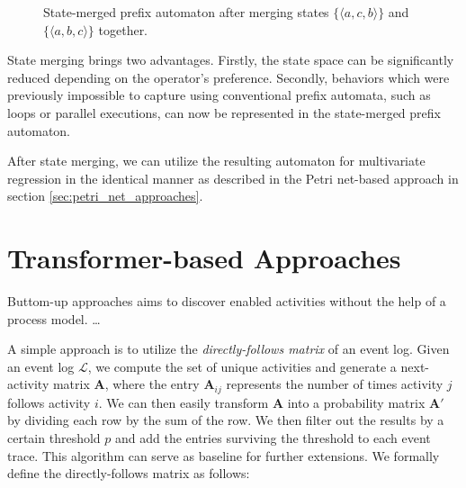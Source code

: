 \begin{figure}[h!]
    \centering
    \caption{State-merged prefix automaton after merging states $\{ \langle a, c, b \rangle \}$ and $\{ \langle a, b, c \rangle \}$ together.}
    \label{fig:state_merged_prefix_automaton_1}
\end{figure}

State merging brings two advantages. Firstly, the state space can be significantly reduced depending on the operator's preference. Secondly, behaviors which were previously impossible to capture using conventional prefix automata, such as loops or parallel executions, can now be represented in the state-merged prefix automaton.

After state merging, we can utilize the resulting automaton for multivariate regression in the identical manner as described in the Petri net-based approach in section \ref{sec:petri_net_approaches}.

\section{Transformer-based Approaches}

Buttom-up approaches aims to discover enabled activities without the help of a process model. \dots

A simple approach is to utilize the \emph{directly-follows matrix} of an event log.
Given an event log $\mathcal{L}$, we compute the set of unique activities and generate a next-activity matrix $\mathbf{A}$, where the entry $\mathbf{A}_{ij}$ represents the number of times activity $j$ follows activity $i$. We can then easily transform $\mathbf{A}$ into a probability matrix $\mathbf{A'}$ by dividing each row by the sum of the row. We then filter out the results by a certain threshold $p$ and add the entries surviving the threshold to each event trace. This algorithm can serve as baseline for further extensions. We formally define the directly-follows matrix as follows:

